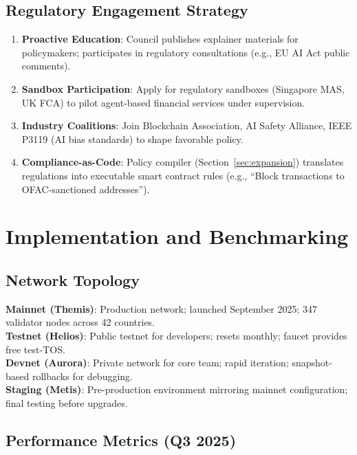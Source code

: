 \documentclass[11pt]{article}
\begin{document}
\subsection{Regulatory Engagement Strategy}

\begin{enumerate}[noitemsep]
  \item \textbf{Proactive Education}: Council publishes explainer materials for policymakers; participates in regulatory consultations (e.g., EU AI Act public comments).
  \item \textbf{Sandbox Participation}: Apply for regulatory sandboxes (Singapore MAS, UK FCA) to pilot agent-based financial services under supervision.
  \item \textbf{Industry Coalitions}: Join Blockchain Association, AI Safety Alliance, IEEE P3119 (AI bias standards) to shape favorable policy.
  \item \textbf{Compliance-as-Code}: Policy compiler (Section~\ref{sec:expansion}) translates regulations into executable smart contract rules (e.g., ``Block transactions to OFAC-sanctioned addresses'').
\end{enumerate}

\section{Implementation and Benchmarking}
\label{sec:implementation}

\subsection{Network Topology}

\textbf{Mainnet (Themis)}: Production network; launched September 2025; 347 validator nodes across 42 countries.\\
\textbf{Testnet (Helios)}: Public testnet for developers; resets monthly; faucet provides free test-TOS.\\
\textbf{Devnet (Aurora)}: Private network for core team; rapid iteration; snapshot-based rollbacks for debugging.\\
\textbf{Staging (Metis)}: Pre-production environment mirroring mainnet configuration; final testing before upgrades.

\subsection{Performance Metrics (Q3 2025)}
\end{document}
